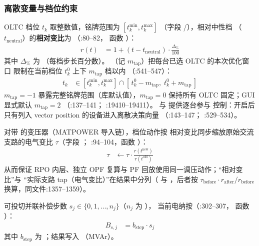 \subsubsection*{离散变量与档位约束}
OLTC 档位 $t_k$ 取整数值，铭牌范围为 $[t_k^{\min},t_k^{\max}]$
（字段 /），相对中性档 
（$t_{\mathrm{neutral}}$）的\textbf{相对变比}为
（:80--82，
函数 ）：
\begin{align*}
r(t) &= 1 + (t - t_{\mathrm{neutral}})\cdot \frac{\Delta_{\%}}{100}
\end{align*}
其中 $\Delta_{\%}$ 为 （每档步长百分数）。
（记 $m_{\mathrm{tap}}$）把每台已选 OLTC 的本次优化窗口
限制在当前档位 $t_k^{0}$ 上下 $m_{\mathrm{tap}}$ 档以内
（:541--547）：
\begin{align*}
t_k &\in [t_k^{\min},t_k^{\max}]\cap
        [\,t_k^{0}-m_{\mathrm{tap}},\;t_k^{0}+m_{\mathrm{tap}}\,]
\end{align*}
$m_{\mathrm{tap}}=-1$ 暴露完整铭牌范围（库默认值），$m_{\mathrm{tap}}=0$
保持所有 OLTC 固定；GUI 显式默认 $m_{\mathrm{tap}}=2$
（:137--141；
:19410--19411）。
 与  提供逐台参与
控制：开启后只有列入 vector position 的设备进入离散决策向量
（:143--147；
:529--534）。

对带  的变压器（MATPOWER 导入链），档位动作按
相对变比同步缩放原始交流支路的电气变比 $\tau$（字段 ；
:94--104，函数
）：
\begin{align*}
\tau &\leftarrow \tau\cdot \frac{r(t^{\mathrm{new}})}{r(t^{\mathrm{old}})}
\end{align*}
从而保证 RPO 内层、独立 OPF 复算与 PF 回放使用同一调压动作；“相对变比”与
“实际支路 tap（电气变比）”在结果中分列（ 与
，后者按
$\tau_{\mathrm{before}}\cdot r_{\mathrm{after}}/r_{\mathrm{before}}$
换算，同文件:1357--1359）。

可投切并联补偿步数 $s_j\in\{0,1,\ldots,n_j\}$（$n_j$ 为 ），
当前电纳按（:302--307，
函数 ）：
\begin{align*}
B_{s,j} &= b_{\mathrm{step}}\cdot s_j
\end{align*}
其中 $b_{\mathrm{step}}$ 为 ；结果写入 
（MVAr）。

